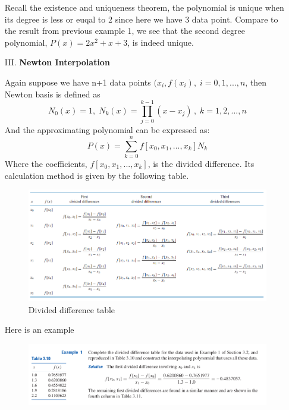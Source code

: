 \begin{enumerate}
\begin{solution}
		Recall the existence and uniqueness theorem, the polynomial is unique when its degree is less or euqal to 2 since here we have 3 data point. Compare to the result from previous example 1, we see that the second degree polynomial, $P(x) = 2x^2 + x + 3$, is indeed unique.
	\end{solution}

	\item [III.]
	\textbf{Newton Interpolation}
	\begin{thm}
		Again suppose we have n+1 data points $(x_i,f(x_i),\;i=0,1,...,n$, then Newton basis is defined as 
		\[ N_0(x) = 1,\; N_k(x) = \prod_{j=0}^{k-1} (x-x_j)\,,\;k = 1,2,...,n\]
		And the approximating polynomial can be expressed as:
		\[P(x) = \sum_{k=0}^n f[x_0,x_1,...,x_k] N_k\]
		Where the coefficients, $f[x_0,x_1,...,x_k]$, is the divided difference. Its calculation method is given by the following table.
		\begin{figure} [H]
			\includegraphics[width=11cm]{img/divided_difference}
			\caption{Divided difference table}
		\end{figure}
	\end{thm}
	
	
	\newpage
	\begin{ex}
		Here is an example
		\begin{figure}[H]
			\centering
			\includegraphics[width=11cm]{img/chapter4_divided_difference_ex.png}
		\end{figure}
		

\end{ex}
\end{enumerate}
